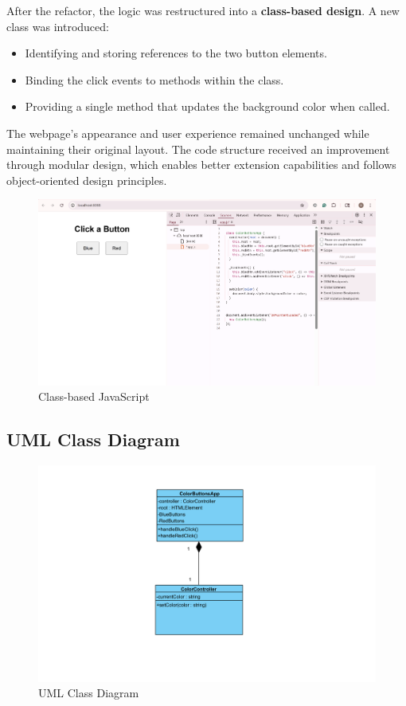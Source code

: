 After the refactor, the logic was restructured into a \textbf{class-based design}.
A new class was introduced:

\begin{itemize}
  \item Identifying and storing references to the two button elements.
  \item Binding the click events to methods within the class.
  \item Providing a single method that updates the background color when called.
\end{itemize}

The webpage's appearance and user experience remained unchanged while maintaining their original layout. The code structure received an improvement through modular design, which enables better extension capabilities and follows object-oriented design principles.

\begin{figure} [H]
\includegraphics[width=\textwidth]{class .png}
  \centering
  \caption{Class-based JavaScript}
  \vspace{-0.3cm}
\end{figure}

\subsection{UML Class Diagram}
\begin{figure} [H]
\includegraphics[width=\textwidth]{class diagram.png}
  \centering
  \caption{UML Class Diagram}
  \vspace{-0.3cm}
\end{figure}

